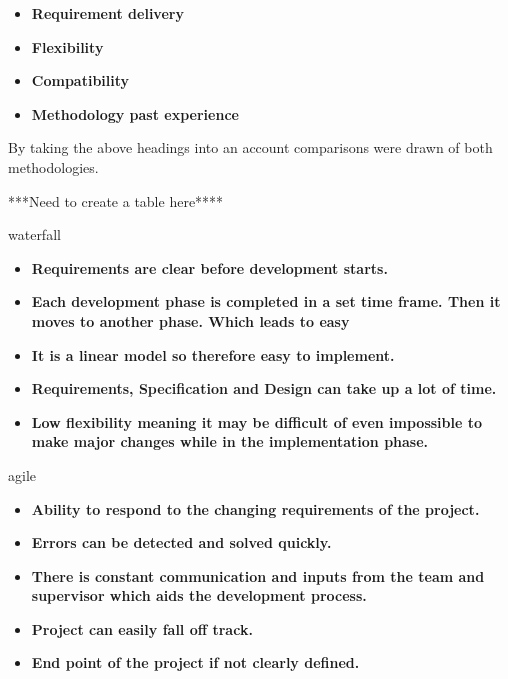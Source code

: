 \begin{itemize}

    \item \textbf{Requirement delivery}
    
    \item \textbf{Flexibility}
    
    \item \textbf{Compatibility}
    
     \item \textbf{Methodology past experience}
    
\end{itemize}

By taking the above headings into an account comparisons were drawn of both methodologies.



***Need to create a table here****

waterfall


\begin{itemize}

    \item \textbf{Requirements are clear before development starts.}
    
    \item \textbf{Each development phase is completed in a set time frame. Then it moves to another phase. Which leads to easy}
    
    \item \textbf{It is a linear model so therefore easy to implement.}
    
    \item \textbf{Requirements, Specification and Design can take up a lot of time.}
     
    \item \textbf{Low flexibility meaning it may be difficult of even impossible to make major changes while in the implementation phase.}
    
\end{itemize}



agile


\begin{itemize}

    \item \textbf{Ability to respond to the changing requirements of the project.}
    
    \item \textbf{Errors can be detected and solved quickly.}
    
    \item \textbf{There is constant communication and inputs from the team and supervisor which aids the development process.}
     
    \item \textbf{Project can easily fall off track.}
     
    \item \textbf{End point of the project if not clearly defined.}
     
    \vspace{70mm} %
 
    
\end{itemize}

